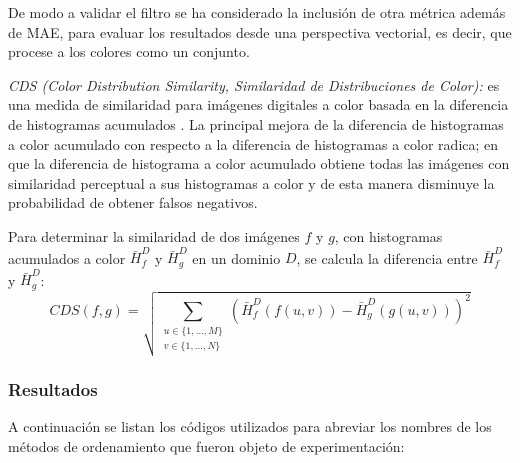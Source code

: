De modo a validar el filtro se ha considerado la inclusi\'on de otra m\'etrica adem\'as de MAE, para evaluar los resultados desde una perspectiva vectorial, es decir, que procese a los colores como un conjunto.


\textsl{CDS (Color Distribution Similarity, Similaridad de Distribuciones de Color):} es una medida de similaridad para imágenes digitales a color basada en la diferencia de histogramas acumulados \cite{stricker1995similarity}.  La principal mejora de la diferencia de histogramas a color acumulado con respecto a la diferencia de histogramas a color radica; en que la diferencia de histograma a color acumulado obtiene todas las imágenes con similaridad perceptual a sus histogramas a color y de esta manera disminuye la probabilidad de obtener falsos negativos.

Para determinar la similaridad de dos imágenes $f$ y $g$, con histogramas acumulados a color $\bar{H}^D_f$ y $\bar{H}^D_g$ en un dominio $D$, se calcula la diferencia entre $\bar{H}^D_f$ y $\bar{H}^D_g$: 
\begin{equation}
CDS(f,g) = \sqrt{\sum_{\substack{u\in \{1, ..., M\}\\ v \in \{1, ..., N\}}} (\bar{H}^D_f(f(u, v)) - \bar{H}^D_g(g(u, v)))^2}
\end{equation}

%
\subsubsection{Resultados}

A continuaci\'on se listan los c\'odigos utilizados para abreviar los nombres de los métodos de ordenamiento que fueron objeto de experimentación:


